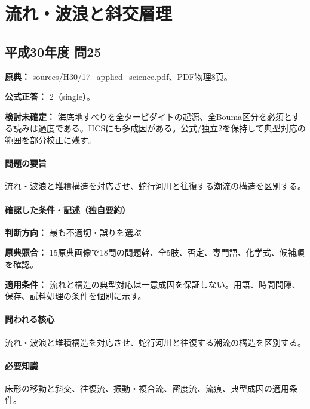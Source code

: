\section{流れ・波浪と斜交層理}

\subsection{平成30年度 問25}
\label{q:h30-reg-applied-25}

\noindent\textbf{原典：} sources/H30/17\_applied\_science.pdf、PDF物理8頁。

\textbf{公式正答：} 2（single）。

\par\textbf{検討未確定：} 海底地すべりを全タービダイトの起源、全Bouma区分を必須とする読みは過度である。HCSにも多成因がある。公式/独立2を保持して典型対応の範囲を部分校正に残す。

\paragraph{問題の要旨} 流れ・波浪と堆積構造を対応させ、蛇行河川と往復する潮流の構造を区別する。

\paragraph{確認した条件・記述（独自要約）}\mbox{}\par

\noindent\textbf{判断方向：} 最も不適切・誤りを選ぶ\par

\noindent\textbf{原典照合：} 15原典画像で18問の問題幹、全5肢、否定、専門語、化学式、候補順を確認。\par

\noindent\textbf{適用条件：} 流れと構造の典型対応は一意成因を保証しない。用語、時間間隙、保存、試料処理の条件を個別に示す。\par

\paragraph{問われる核心} 流れ・波浪と堆積構造を対応させ、蛇行河川と往復する潮流の構造を区別する。

\paragraph{必要知識} 床形の移動と斜交、往復流、振動・複合流、密度流、流痕、典型成因の適用条件。

